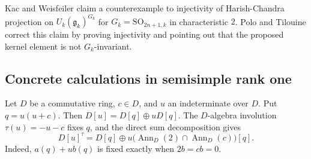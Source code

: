 \documentclass[twoside,a4paper,12pt,reqno]{amsart}
\theoremstyle{remark}
\numberwithin{equation}{section}
\newcommand{\fg}{\mathfrak g}
\DeclareMathOperator{\Ann}{Ann}
\begin{document}
Kac and Weisfeiler \cite[\S9.4(d)]{KW} claim a counterexample to
injectivity of Harish-Chandra projection on \(U_k(\fg_k)^{G_k}\)
for \(G_k=\mathrm{SO}_{2n+1,k}\) in characteristic \(2\).
Polo and Tilouine \cite[\S2.6.1, Lemma and Remark]{PT} correct
this claim by proving injectivity and pointing out that the proposed
kernel element is not \(G_k\)-invariant.

\subsection{Concrete calculations in semisimple rank one}

Let \(D\) be a commutative ring, \(c\in D\), and \(u\) an indeterminate
over \(D\). Put \(q=u(u+c)\). Then
\(D[u]=D[q]\oplus uD[q]\). The \(D\)-algebra involution
\(\tau(u)=-u-c\) fixes \(q\),
and the direct sum decomposition gives
\begin{equation}\label{eq:quadratic-involution}
D[u]^\tau
=D[q]\oplus u\bigl(\Ann_D(2)\cap\Ann_D(c)\bigr)[q].
\end{equation}
Indeed, \(a(q)+ub(q)\) is fixed exactly when \(2b=cb=0\).
\end{document}
